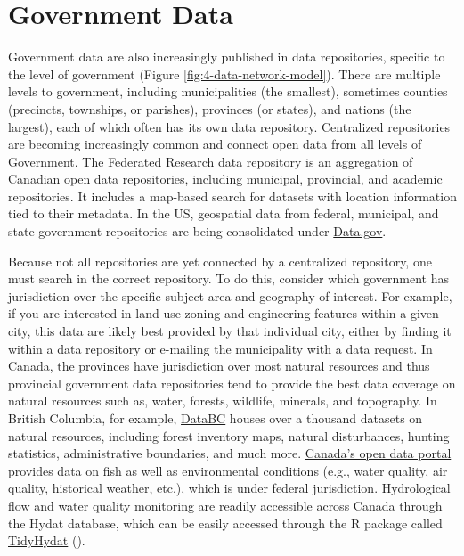 \documentclass[
]{book}
\begin{document}
\section{Government Data}\label{government-data}

Government data are also increasingly published in data repositories, specific to the level of government (Figure \ref{fig:4-data-network-model}). There are multiple levels to government, including municipalities (the smallest), sometimes counties (precincts, townships, or parishes), provinces (or states), and nations (the largest), each of which often has its own data repository. Centralized repositories are becoming increasingly common and connect open data from all levels of Government. The \href{https://www.frdr-dfdr.ca/repo/}{Federated Research data repository} is an aggregation of Canadian open data repositories, including municipal, provincial, and academic repositories. It includes a map-based search for datasets with location information tied to their metadata. In the US, geospatial data from federal, municipal, and state government repositories are being consolidated under \href{https://www.data.gov/}{Data.gov}.

Because not all repositories are yet connected by a centralized repository, one must search in the correct repository. To do this, consider which government has jurisdiction over the specific subject area and geography of interest. For example, if you are interested in land use zoning and engineering features within a given city, this data are likely best provided by that individual city, either by finding it within a data repository or e-mailing the municipality with a data request. In Canada, the provinces have jurisdiction over most natural resources and thus provincial government data repositories tend to provide the best data coverage on natural resources such as, water, forests, wildlife, minerals, and topography. In British Columbia, for example, \href{https://www.data.gov.bc.ca/}{DataBC} houses over a thousand datasets on natural resources, including forest inventory maps, natural disturbances, hunting statistics, administrative boundaries, and much more. \href{https://open.canada.ca/en/open-data}{Canada's open data portal} provides data on fish as well as environmental conditions (e.g., water quality, air quality, historical weather, etc.), which is under federal jurisdiction. Hydrological flow and water quality monitoring are readily accessible across Canada through the Hydat database, which can be easily accessed through the R package called \href{https://cran.r-project.org/web/packages/tidyhydat/vignettes/tidyhydat_an_introduction.html}{TidyHydat} (\citet{albers_tidyhydat_2017}).
\end{document}
